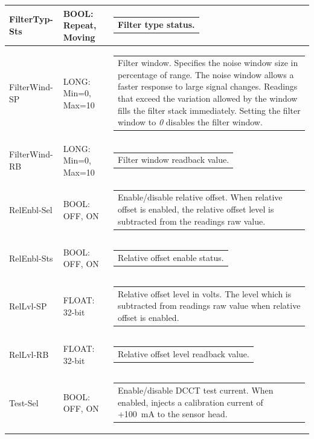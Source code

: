 \documentclass[openany]{article}
\begin{document}
\begin{longtable}{| m{3.0cm} m{4.5cm} m{7.0cm} |}
		FilterTyp-Sts & BOOL: Repeat, Moving & \begin{tabular}{@{}m{6cm}@{}}
	    					Filter type status.
						\end{tabular} \\ \hline
		FilterWind-SP & LONG: Min=0, Max=10 & \begin{tabular}{@{}m{6cm}@{}}
	    					Filter window. Specifies the noise window size in percentage of range. The noise window allows a faster response to large signal changes. Readings that exceed the variation allowed by the window fills the filter stack immediately. Setting the filter window to \emph{0} disables the filter window.
						\end{tabular} \\ \hline
		FilterWind-RB & LONG: Min=0, Max=10 & \begin{tabular}{@{}m{6cm}@{}}
	    					Filter window readback value.
						\end{tabular} \\ \hline
		RelEnbl-Sel & BOOL: OFF, ON & \begin{tabular}{@{}m{6cm}@{}}
	    					Enable/disable relative offset. When relative offset is enabled, the relative offset level is subtracted from the readings raw value.
						\end{tabular} \\ \hline
		RelEnbl-Sts & BOOL: OFF, ON & \begin{tabular}{@{}m{6cm}@{}}
	    					Relative offset enable status.
						\end{tabular} \\ \hline
		RelLvl-SP & FLOAT: 32-bit & \begin{tabular}{@{}m{6cm}@{}}
	    					Relative offset level in volts. The level which is subtracted from readings raw value when relative offset is enabled.
						\end{tabular} \\ \hline
		RelLvl-RB & FLOAT: 32-bit & \begin{tabular}{@{}m{6cm}@{}}
	    					Relative offset level readback value.
						\end{tabular} \\ \hline
		Test-Sel & BOOL: OFF, ON & \begin{tabular}{@{}m{6cm}@{}}
	    					Enable/disable DCCT test current. When enabled, injects a calibration current of +\SI{100}{\milli\ampere} to the sensor head.

\end{tabular}
\end{longtable}
\end{document}
